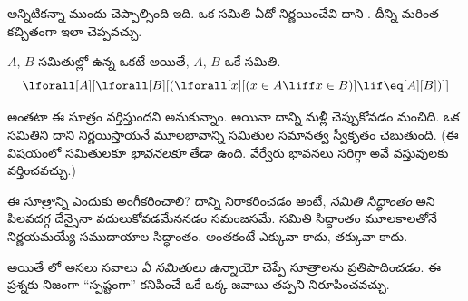 \documentclass[../../../include/open-logic-section]{subfiles}
\begin{document}

అన్నిటికన్నా ముందు చెప్పాల్సింది ఇది. ఒక సమితి ఏదో నిర్ణయించేవి దాని
.
దీన్ని మరింత కచ్చితంగా ఇలా చెప్పవచ్చు.

\begin{axiom}[సమితుల సమానత్వ సూత్రం]
$A$, $B$ సమితుల్లో ఉన్న
 ఒకటే అయితే,
$A$, $B$ ఒకే సమితి.
\[
  \lforall[A][\lforall[B][(\lforall[x][(x \in A \liff x \in B)] \lif
  \eq[A][B])]]
\]
\end{axiom}

 అంతటా ఈ సూత్రం వర్తిస్తుందని
అనుకున్నాం. అయినా దాన్ని మళ్లీ చెప్పుకోవడం మంచిది. ఒక సమితిని దాని
 నిర్ణయిస్తాయనే మూలభావాన్ని
సమితుల సమానత్వ స్వీకృతం చెబుతుంది. (ఈ విషయంలో సమితులకూ
\emph{భావనలకూ} తేడా ఉంది. వేర్వేరు భావనలు సరిగ్గా అవే
వస్తువులకు వర్తించవచ్చు.)

ఈ సూత్రాన్ని ఎందుకు అంగీకరించాలి? దాన్ని నిరాకరించడం అంటే,
\emph{సమితి సిద్ధాంతం} అని పిలవదగ్గ దేన్నైనా వదులుకోవడమేననడం
సమంజసమే. సమితి సిద్ధాంతం మూలకాలతోనే నిర్ణయమయ్యే సముదాయాల
సిద్ధాంతం. అంతకంటే ఎక్కువా కాదు, తక్కువా కాదు.

అయితే లో అసలు సవాలు \emph{ఏ సమితులు
ఉన్నాయో} చెప్పే సూత్రాలను ప్రతిపాదించడం. ఈ ప్రశ్నకు నిజంగా
``స్పష్టంగా'' కనిపించే ఒకే ఒక్క జవాబు తప్పని నిరూపించవచ్చు.
\end{document}
